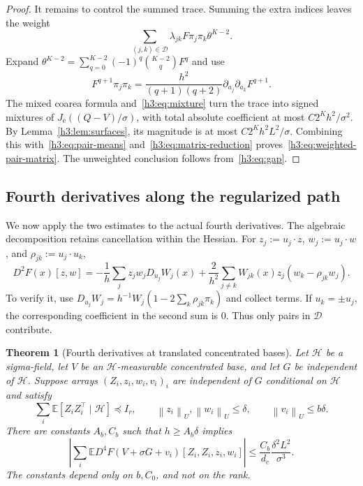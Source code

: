 \documentclass[11pt,letterpaper]{article}
\newtheorem{theorem}{Theorem}
\theoremstyle{remark}
\newcommand{\E}{\mathbb E}
\newcommand{\cD}{\mathcal D}
\newcommand{\norm}[1]{\left\lVert#1\right\rVert}
\begin{document}
\begin{proof}
It remains to control the summed trace. Summing the extra indices
leaves the weight
\[
 \sum_{(j,k)\in\cD}\lambda_{jk}F\pi_j\pi_k\theta^{K-2}.
\]
Expand
$\theta^{K-2}=\sum_{q=0}^{K-2}(-1)^q\binom{K-2}{q}F^q$ and use
\[
 F^{q+1}\pi_j\pi_k
 =\frac{h^2}{(q+1)(q+2)}
       \partial_{a_j}\partial_{a_k}F^{q+1}.
\]
The mixed coarea formula and~\eqref{h3:eq:mixture} turn the trace into
signed mixtures of $J_{\mathrm e}((Q-V)/\sigma)$, with total absolute
coefficient at most $C2^K h^2/\sigma^2$.
By Lemma~\ref{h3:lem:surfaces}, its magnitude is at most
$C2^K h^2L^2/\sigma$. Combining this with~\eqref{h3:eq:pair-means}
and~\eqref{h3:eq:matrix-reduction} proves~\eqref{h3:eq:weighted-pair-matrix}.
The unweighted conclusion follows from~\eqref{h3:eq:gap}.
\end{proof}

\subsection{Fourth derivatives along the regularized path}
We now apply the two estimates to the actual fourth derivatives.
The algebraic decomposition retains cancellation within the Hessian.
For $z_j:=u_j\cdot z$, $w_j:=u_j\cdot w$, and
$\rho_{jk}:=u_j\cdot u_k$,
\begin{equation}
 D^2F(x)[z,w]
 =-\frac1h\sum_j z_jw_jD_{u_j}W_j(x)
 +\frac2{h^2}\sum_{j\ne k}W_{jk}(x)z_j(w_k-\rho_{jk}w_j).
 \label{h3:eq:hessian}
\end{equation}
To verify it, use
$D_{u_j}W_j=h^{-1}W_j(1-2\sum_k\rho_{jk}\pi_k)$ and collect terms.
If $u_k=\pm u_j$, the corresponding coefficient in the second sum is
$0$. Thus only pairs in $\cD$ contribute.

\begin{theorem}[Fourth derivatives at translated concentrated bases]
\label{h3:thm:fourth}
Let $\mathcal H$ be a sigma-field, let $V$ be an $\mathcal H$-measurable
concentrated base, and let $G$ be independent of $\mathcal H$.
Suppose arrays $(Z_i,z_i,w_i,v_i)_i$ are independent of $G$
conditional on $\mathcal H$ and satisfy
\[
 \sum_i\E[Z_iZ_i^\top\mid\mathcal H]\preceq I_r,\qquad
 \norm{z_i}_U,\norm{w_i}_U\le\delta,\qquad
 \norm{v_i}_U\le b\delta.
\]
There are constants $A_b,C_b$ such that $h\ge A_b\delta$ implies
\begin{equation}
 \left|\sum_i\E D^4F(V+\sigma G+v_i)[Z_i,Z_i,z_i,w_i]\right|
 \le \frac{C_b}{d_c}\frac{\delta^2L^2}{\sigma^3}.
 \label{h3:eq:fourth-bound}
\end{equation}
The constants depend only on $b,C_0$, and not on the rank.
\end{theorem}
\end{document}
